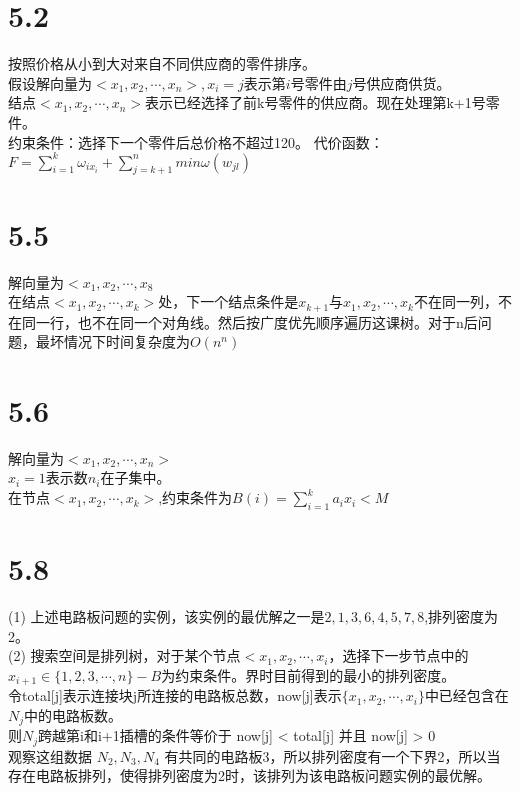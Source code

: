 \documentclass[a4paper]{article}
\begin{document}
\section*{5.2}
按照价格从小到大对来自不同供应商的零件排序。\\
假设解向量为$<x_1,x_2,\cdots,x_n>,x_i =j 表示第i号零件由j号供应商供货。$\\
结点$<x_1,x_2,\cdots,x_n>$表示已经选择了前k号零件的供应商。现在处理第k+1号零件。 \\
约束条件：选择下一个零件后总价格不超过120。
代价函数：\\
$F=\sum_{i=1}^k \omega_{ix_i}+\sum_{j=k+1}^{n}min{\omega (w_{jl})}$

\section*{5.5}
解向量为$<x_1,x_2,\cdots,x_8$ \\
在结点$<x_1,x_2,\cdots,x_k>处$，下一个结点条件是$x_{k+1}与x_1,x_2,\cdots,x_k$不在同一列，不在同一行，也不在同一个对角线。然后按广度优先顺序遍历这课树。对于n后问题，最坏情况下时间复杂度为$O(n^n)$

\section*{5.6}
解向量为$<x_1,x_2,\cdots,x_n>$ \\
$x_i=1$表示数$n_i$在子集中。\\
在节点$<x_1,x_2,\cdots,x_k>$,约束条件为$B(i)=\sum_{i=1}^k a_i x_i  < M$

\section*{5.8}
(1) 上述电路板问题的实例，该实例的最优解之一是${2,1,3,6,4,5,7,8}$,排列密度为2。\\
(2) 搜索空间是排列树，对于某个节点$<x_1,x_2,\cdots,x_i$，选择下一步节点中的$x_{i+1} \in \{1,2,3,\cdots,n\} - B$为约束条件。界时目前得到的最小的排列密度。 \\
令total[j]表示连接块j所连接的电路板总数，now[j]表示$\{x_1,x_2,\cdots,x_i\}$中已经包含在$N_j$中的电路板数。\\
则$N_j$跨越第i和i+1插槽的条件等价于 now[j] < total[j] 并且 now[j] > 0 \\
观察这组数据 $N_2,N_3,N_4$ 有共同的电路板3，所以排列密度有一个下界2，所以当存在电路板排列，使得排列密度为2时，该排列为该电路板问题实例的最优解。
\end{document}
